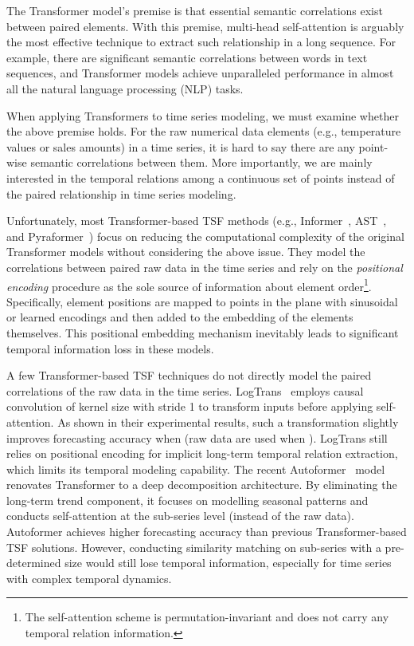 \documentclass{article}
\begin{document}
The Transformer model's premise is that essential semantic correlations exist between paired elements. With this premise, multi-head self-attention is arguably the most effective technique to extract such relationship in a long sequence. For example, there are significant semantic correlations between words in text sequences, and Transformer models achieve unparalleled performance in almost all the natural language processing (NLP) tasks. 

When applying Transformers to time series modeling, we must examine whether the above premise holds. For the raw numerical data elements (e.g., temperature values or sales amounts) in a time series, it is hard to say there are any point-wise semantic correlations between them.  More importantly, we are mainly interested in the temporal relations among a continuous set of points instead of the paired relationship in time series modeling.  

Unfortunately, most Transformer-based TSF methods (e.g., Informer~\cite{Zhou2020InformerBE}, AST~\cite{Wu2020AdversarialST}, and Pyraformer~\cite{Liu2022Pyraformer}) focus on reducing the computational complexity of the original Transformer models without considering the above issue. They model the correlations between paired raw data in the time series and rely on the \emph{positional encoding} procedure as the sole source of information about element order\footnote{The self-attention scheme is permutation-invariant and does not carry any temporal relation information.}. Specifically, element positions are mapped to points in the plane with sinusoidal or learned encodings and then added to the embedding of the elements themselves. This positional embedding mechanism inevitably leads to significant temporal information loss in these models. 






A few Transformer-based TSF techniques do not directly model the paired correlations of the raw data in the time series. LogTrans~\citep{li2019enhancing} employs causal convolution of kernel size  with stride 1 to transform inputs before applying self-attention. As shown in their experimental results, such a transformation slightly improves forecasting accuracy when  (raw data are used when ). LogTrans still relies on positional encoding for implicit long-term temporal relation extraction, which limits its temporal modeling capability. The recent Autoformer~\citep{Wu2021AutoformerDT} model renovates Transformer to a deep decomposition architecture. By eliminating the long-term trend component, it focuses on modelling seasonal patterns and conducts self-attention at the sub-series level (instead of the raw data). Autoformer achieves higher forecasting accuracy than previous Transformer-based TSF solutions. However, conducting similarity matching on sub-series with a pre-determined size would still lose temporal information, especially for time series with complex temporal dynamics.    
\end{document}
